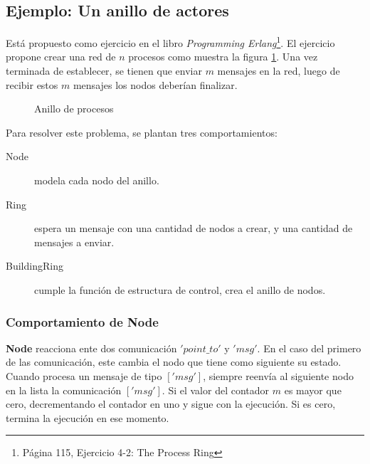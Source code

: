 \subsection{Ejemplo: Un anillo de actores}
Está propuesto como ejercicio en el libro \textit{Programming Erlang}\cite{Cesarini:2009:EP:1717841}\footnote{Página 115, Ejercicio 4-2: The Process Ring}. El ejercicio propone crear una red de $n$ procesos como muestra la figura \ref{fig:anillo}. Una vez terminada de establecer, se tienen que enviar $m$ mensajes en la red, luego de recibir estos $m$ mensajes los nodos deberían finalizar.


\begin{figure}[H]
\centering
{}
\caption{Anillo de procesos}
\label{fig:anillo}
\end{figure}

Para resolver este problema, se plantan tres comportamientos:

\begin{description}
 \item [Node] modela cada nodo del anillo.
 \item [Ring] espera un mensaje con una cantidad de nodos a crear, y una cantidad de mensajes a enviar.
 \item [BuildingRing] cumple la función de estructura de control, crea el anillo de nodos.
\end{description}

\subsubsection*{Comportamiento de Node}

\textbf{Node} reacciona ente dos comunicación $'point\_to'$ y $'msg'$. En el caso del primero de las comunicación, este cambia el nodo que tiene como siguiente su estado.
Cuando procesa un mensaje de tipo $['msg']$, siempre reenvía al siguiente nodo en la lista la comunicación $['msg']$. Si el valor del contador $m$ es mayor que cero, decrementando el contador en uno y sigue con la ejecución. Si es cero, termina la ejecución en ese momento.

